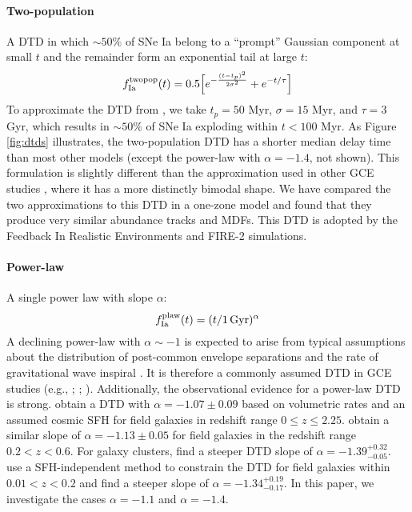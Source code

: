 \documentclass[twocolumn,twocolappendix,linenumbers,trackchanges]{aastex631}
\begin{document}
\paragraph{Two-population} A DTD in which $\sim50\%$ of SNe Ia belong to a ``prompt'' Gaussian component at small $t$ and the remainder form an exponential tail at large $t$:
\begin{equation}
    f_{\rm Ia}^{\rm twopop}(t) = 0.5\Big[e^{-\frac{(t-t_p)^2}{2\sigma^2}} + e^{-t/\tau}\Big]
    \label{eq:prompt-dtd}
\end{equation}
To approximate the DTD from \citet{Mannucci2006-TwoPopulations}, we take $t_p=50$ Myr, $\sigma=15$ Myr, and $\tau=3$ Gyr, which results in $\sim 50\%$ of SNe Ia exploding within $t<100$ Myr. As Figure \ref{fig:dtds} illustrates, the two-population DTD has a shorter median delay time than most other models (except the power-law with $\alpha=-1.4$, not shown).
This formulation is slightly different than the approximation used in other GCE studies \citep[e.g.,][]{Matteucci2006-BimodalDTDConsequences,Poulhazan2018-PrecisionPollution}, where it has a more distinctly bimodal shape. We have compared the two approximations to this DTD in a one-zone model and found that they produce very similar abundance tracks and MDFs. This DTD is adopted by the Feedback In Realistic Environments \citep[FIRE;][]{Hopkins2014-FIRE-1} and FIRE-2 \citep{Hopkins2018-FIRE-2} simulations.

\paragraph{Power-law} A single power law with slope $\alpha$:
\begin{equation}
    f_{\rm Ia}^{\rm plaw}(t) = (t/1\,\rm{Gyr})^\alpha
    \label{eq:powerlaw-dtd}
\end{equation}
A declining power-law with $\alpha\sim-1$ is expected to arise from typical assumptions about the distribution of post-common envelope separations and the rate of gravitational wave inspiral \citep[see Section 3.5 from][]{Maoz2014-Review}. It is therefore a commonly assumed DTD in GCE studies (e.g., \citealt{Rybizki2017-Chempy}; ; \citealt{Weinberg2023-CCSNYield}). Additionally, the observational evidence for a power-law DTD is strong. \citet{Maoz2017-CosmicDTD} obtain a DTD with $\alpha=-1.07\pm0.09$ based on volumetric rates and an assumed cosmic SFH for field galaxies in redshift range $0\leq z\leq 2.25$. \citet{Wiseman2021-DESRates} obtain a similar slope of $\alpha=-1.13\pm0.05$ for field galaxies in the redshift range $0.2<z<0.6$. For galaxy clusters, \citet{Maoz2017-CosmicDTD} find a steeper DTD slope of $\alpha=-1.39^{+0.32}_{-0.05}$. \citet{Heringer2019-FieldGalaxyDTD} use a SFH-independent method to constrain the DTD for field galaxies within $0.01<z<0.2$ and find a steeper slope of $\alpha=-1.34^{+0.19}_{-0.17}$.
In this paper, we investigate the cases $\alpha=-1.1$ and $\alpha=-1.4$.
\end{document}
